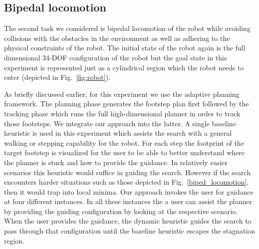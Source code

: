 \documentclass{article}
\begin{document}




\subsection{Bipedal locomotion}
\label{subsec:locomotion}
The second task we considered is bipedal locomotion of the robot while avoiding collisions with the obstacles in the environment as well as adhering to the physical constraints of the robot. The initial state of the robot again is the full dimensional 34-DOF configuration of the robot but the goal state in this experiment is represented just as a cylindrical region which the robot needs to enter (depicted in Fig.~\ref{fig:robot}).

As briefly discussed earlier, for this experiment we use the adaptive planning framework. The planning phase generates the footstep plan first followed by the tracking phase which runs the full high-dimensional planner in order to track those footsteps. We integrate our approach into the latter. A single baseline heuristic is used in this experiment which assists the search with a general walking or stepping capability for the robot. For each step the footprint of the target footstep is visualized for the user to be able to better understand where the planner is stuck and how to provide the guidance. In relatively easier scenarios this heuristic would suffice in guiding the search. However if the search encounters harder situations such as those depicted in Fig.~\ref{biped_locomotion}, then it would trap into local minima. Our approach invokes the user for guidance at four different instances. In all these instances the a user can assist the planner by providing the guiding configuration by looking at the respective scenario. When the user provides the guidance, the dynamic heuristic guides the search to pass through that configuration until the baseline heuristic escapes the stagnation region.
\end{document}
